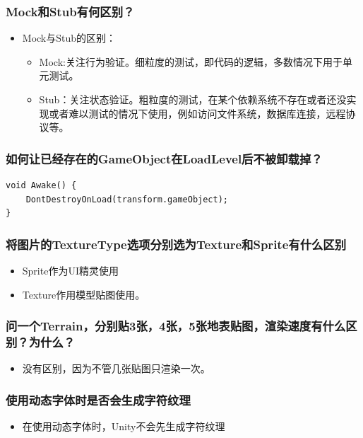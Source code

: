 \documentclass[9pt, b5paper]{article}
\begin{document}
\subsubsection{Mock和Stub有何区别？}
\label{sec:orgf88422a}
\begin{itemize}
\item Mock与Stub的区别：
\begin{itemize}
\item Mock:关注行为验证。细粒度的测试，即代码的逻辑，多数情况下用于单元测试。
\item Stub：关注状态验证。粗粒度的测试，在某个依赖系统不存在或者还没实现或者难以测试的情况下使用，例如访问文件系统，数据库连接，远程协议等。
\end{itemize}
\end{itemize}

\subsubsection{如何让已经存在的GameObject在LoadLevel后不被卸载掉？}
\label{sec:org33c2861}
\begin{verbatim}
void Awake() {
    DontDestroyOnLoad(transform.gameObject);
}
\end{verbatim}
\subsubsection{将图片的TextureType选项分别选为Texture和Sprite有什么区别}
\label{sec:orga25b0e0}
\begin{itemize}
\item Sprite作为UI精灵使用
\item Texture作用模型贴图使用。
\end{itemize}
\subsubsection{问一个Terrain，分别贴3张，4张，5张地表贴图，渲染速度有什么区别？为什么？}
\label{sec:orga86883c}
\begin{itemize}
\item 没有区别，因为不管几张贴图只渲染一次。
\end{itemize}
\subsubsection{使用动态字体时是否会生成字符纹理}
\label{sec:org4c2f087}
\begin{itemize}
\item 在使用动态字体时，Unity不会先生成字符纹理
\end{itemize}
\end{document}
